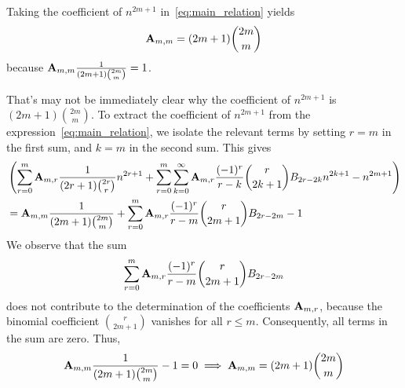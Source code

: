 Taking the coefficient of $n^{2m+1}$ in~\eqref{eq:main_relation} yields
\begin{align*}
    {\mathbf{A}} \sb{m,m} = (2m+1)\binom{2m}{m}
\end{align*}
because ${\mathbf{A}} \sb{m,m} \frac{1}{(2m+1) \binom{2m}{m}} = 1$.

That's may not be immediately clear why the coefficient of $n^{2m+1}$ is $(2m+1)\binom{2m}{m}$.
To extract the coefficient of $n^{2m+1}$ from the expression~\eqref{eq:main_relation},
we isolate the relevant terms by setting $r = m$ in the first sum,
and $k = m$ in the second sum.
This gives
\begin{align*}
[n^{2m+1}]
    &\left(
         \sum_{r=0}^{m} \coeffA{m}{r} \frac{1}{(2r+1) \binom{2r}{r}} n^{2r+1}
         + \sum_{r=0}^{m} \sum_{k=0}^{\infty} \coeffA{m}{r} \frac{(-1)^r}{r-k} \binom{r}{2k+1} \bernoulli{2r - 2k} n^{2k+1}
         - n^{2m+1}
    \right) \\
    &= \coeffA{m}{m} \frac{1}{(2m+1) \binom{2m}{m}}
    + \sum_{r=0}^{m} \coeffA{m}{r} \frac{(-1)^r}{r - m} \binom{r}{2m+1} \bernoulli{2r - 2m}
    - 1
\end{align*}
We observe that the sum
\begin{align*}
    \sum_{r=0}^{m} {\mathbf{A}} \sb{m,r} \frac{(-1)^r}{r - m} \binom{r}{2m+1} {B}\sb{2r - 2m}
\end{align*}
does not contribute to the determination of the coefficients ${\mathbf{A}} \sb{m,r}$, because the binomial coefficient
$\binom{r}{2m+1}$ vanishes for all $r \leq m$.
Consequently, all terms in the sum are zero.
Thus,
\begin{align*}
    {\mathbf{A}} \sb{m,m} \frac{1}{(2m+1) \binom{2m}{m}}  - 1 = 0 \implies {\mathbf{A}} \sb{m,m} = (2m+1) \binom{2m}{m}
\end{align*}

